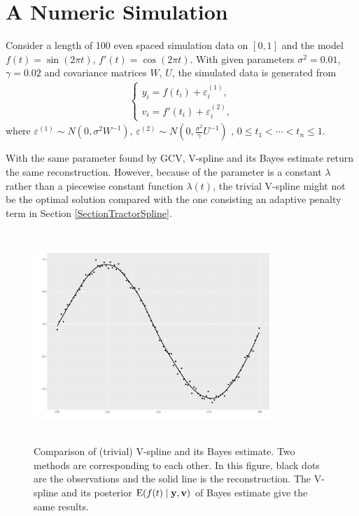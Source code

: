\section{A Numeric Simulation}

Consider a length of 100 even spaced simulation data on $[0,1]$ and the model $f(t)=\sin(2\pi t)$, $f'(t)=\cos(2\pi t)$. With given parameters $\sigma^2=0.01$, $\gamma=0.02$ and covariance matrices $W$, $U$, the simulated data  is generated from  
\begin{align}
\begin{cases}
y_i =f(t_i)+\varepsilon_{i}^{(1)}, \\
v_i =f'(t_i)+\varepsilon_{i}^{(2)}, 
\end{cases}
\end{align}
where $\varepsilon^{(1)}\sim N\left(0,\sigma^2W^{-1}\right)$, $\varepsilon^{(2)}\sim N\left(0,\frac{\sigma^2}{\gamma}U^{-1}\right)$ , $0\leq t_1 < \cdots < t_n \leq 1$. 

With the same parameter found by GCV, V-spline and its Bayes estimate return the same reconstruction. However, because of the parameter is a constant $\lambda$ rather than a piecewise constant function $\lambda(t)$, the trivial V-spline might not be the optimal solution compared with the one consisting an adaptive penalty term in Section \ref{SectionTractorSpline}. 

\begin{figure}[h]
\centering
\includegraphics[width=0.8\textwidth,height=8cm]{Chapters/03GPR/plot/ggsim_cov} 
 \caption{Comparison of (trivial) V-spline and its Bayes estimate. Two methods are corresponding to each other. In this figure, black dots are the observations and the solid line is the reconstruction. The V-spline and its posterior $\mathrm{E}(f(t) \mid \mathbf{y}, \mathbf{v})$ of Bayes estimate give the same results. }
\end{figure}




